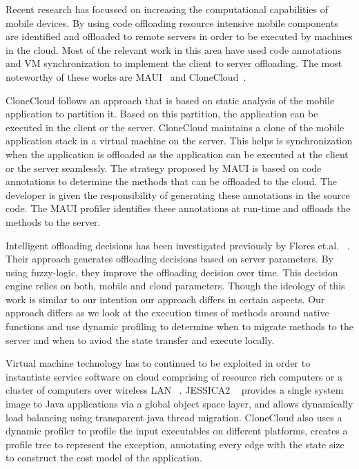 Recent research has focussed on increasing the computational capabilities of mobile devices. By using code offloading
resource intensive mobile components are identified and offloaded to remote servers in order to be executed
by machines in the cloud. Most of the relevant work in this area have used code annotations and VM synchronization to
implement the client to server offloading. The most noteworthy of these works are MAUI~\cite{maui} and CloneCloud~\cite{ccloud}.

CloneCloud follows an approach that is based on static analysis of the mobile application to partition it.
Based on this partition, the application can be executed in the client or the server. CloneCloud maintains
a clone of the mobile application stack in a virtual machine on the server. This helps is synchronization
when the application is offloaded as the application can be executed at the client or the server seamlessly.
The strategy proposed by MAUI is based on code annotations to determine the methods that can be offloaded to the
cloud. The developer is given the responsibility of generating these annotations in the source code. The MAUI
profiler identifies these annotations at run-time and offloads the methods to the server.

Intelligent offloading decisions has been investigated previously by Flores et.al. ~\cite{fuzzy}. Their approach
generates offloading decisions based on server parameters. By using fuzzy-logic, they improve the offloading decision
over time. This decision engine relies on both, mobile and cloud parameters. Though the ideology of this work is similar
to our intention our approach differs in certain aspects. Our approach differs as we look
at the execution times of methods around native functions and use dynamic profiling to determine when to migrate methods
to the server and when to aviod the state transfer and execute locally.

Virtual machine technology has to continued to be exploited in order to instantiate service software on cloud comprising of resource rich computers or a cluster of computers over wireless LAN ~\cite{satya}. JESSICA2 ~\cite{jessica} provides a single system image to Java applications via a global object space layer, and allows dynamically load balancing using transparent java thread migration. CloneCloud also uses a dynamic profiler to profile the input executables on different platforms, creates a profile tree to represent the exception, annotating every edge with the state size to construct the cost model of the application.

